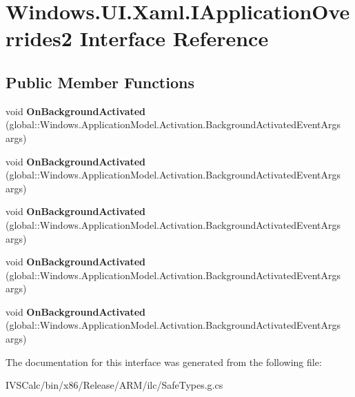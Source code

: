 \hypertarget{interface_windows_1_1_u_i_1_1_xaml_1_1_i_application_overrides2}{}\section{Windows.\+U\+I.\+Xaml.\+I\+Application\+Overrides2 Interface Reference}
\label{interface_windows_1_1_u_i_1_1_xaml_1_1_i_application_overrides2}
\subsection*{Public Member Functions}
\begin{DoxyCompactItemize}
\item 
\mbox{\label{interface_windows_1_1_u_i_1_1_xaml_1_1_i_application_overrides2_a957d3cdd5ddffd9876e25e68b7098cd9}} 
void {\bfseries On\+Background\+Activated} (global\+::\+Windows.\+Application\+Model.\+Activation.\+Background\+Activated\+Event\+Args args)
\item 
\mbox{\label{interface_windows_1_1_u_i_1_1_xaml_1_1_i_application_overrides2_a957d3cdd5ddffd9876e25e68b7098cd9}} 
void {\bfseries On\+Background\+Activated} (global\+::\+Windows.\+Application\+Model.\+Activation.\+Background\+Activated\+Event\+Args args)
\item 
\mbox{\label{interface_windows_1_1_u_i_1_1_xaml_1_1_i_application_overrides2_a957d3cdd5ddffd9876e25e68b7098cd9}} 
void {\bfseries On\+Background\+Activated} (global\+::\+Windows.\+Application\+Model.\+Activation.\+Background\+Activated\+Event\+Args args)
\item 
\mbox{\label{interface_windows_1_1_u_i_1_1_xaml_1_1_i_application_overrides2_a957d3cdd5ddffd9876e25e68b7098cd9}} 
void {\bfseries On\+Background\+Activated} (global\+::\+Windows.\+Application\+Model.\+Activation.\+Background\+Activated\+Event\+Args args)
\item 
\mbox{\label{interface_windows_1_1_u_i_1_1_xaml_1_1_i_application_overrides2_a957d3cdd5ddffd9876e25e68b7098cd9}} 
void {\bfseries On\+Background\+Activated} (global\+::\+Windows.\+Application\+Model.\+Activation.\+Background\+Activated\+Event\+Args args)
\end{DoxyCompactItemize}


The documentation for this interface was generated from the following file\+:\begin{DoxyCompactItemize}
\item 
I\+V\+S\+Calc/bin/x86/\+Release/\+A\+R\+M/ilc/Safe\+Types.\+g.\+cs\end{DoxyCompactItemize}
